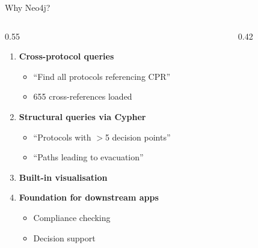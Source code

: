 \documentclass[aspectratio=169, 12pt]{beamer}
\begin{document}
\begin{frame}{Why Neo4j?}
\begin{columns}
\begin{column}{0.55\textwidth}
\begin{enumerate}
    \item \textbf{Cross-protocol queries}
    \begin{itemize}
        \item ``Find all protocols referencing CPR''
        \item 655 cross-references loaded
    \end{itemize}
    \item \textbf{Structural queries via Cypher}
    \begin{itemize}
        \item ``Protocols with $>$5 decision points''
        \item ``Paths leading to evacuation''
    \end{itemize}
    \item \textbf{Built-in visualisation}
    \item \textbf{Foundation for downstream apps}
    \begin{itemize}
        \item Compliance checking
        \item Decision support
    \end{itemize}
\end{enumerate}
\end{column}
\begin{column}{0.42\textwidth}
\centering
{}
\end{column}
\end{columns}
\end{frame}
\end{document}
